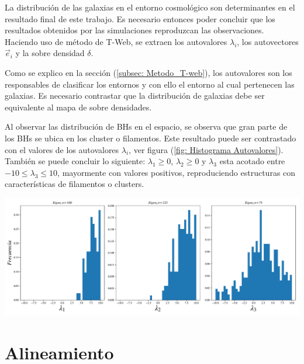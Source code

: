 La distribución de las galaxias en el entorno cosmológico son determinantes en el resultado final de este trabajo. Es necesario entonces poder concluir que los resultados obtenidos por las simulaciones reproduzcan las observaciones. Haciendo uso de método de T-Web, se extraen los autovalores $\lambda_{i}$, los autovectores $\vec{e}_{i}$ y la sobre densidad $\delta$. 

Como se explico en la sección (\ref{subsec: Metodo_T-web}),  los autovalores son los responsables de clasificar los entornos y con ello el entorno al cual pertenecen las galaxias. Es necesario contrastar que la distribución de galaxias debe ser equivalente al mapa de sobre densidades. 


Al observar las distribución de BHs en el espacio, se observa que gran parte de los BHs se ubica en los cluster o filamentos. Este resultado puede ser contrastado con el valores de los autovalores $\lambda_{i}$, ver figura (\ref{fig: Histograma Autovalores}). También se puede concluir lo siguiente:  $\lambda_{1}\geq 0$,  $\lambda_{2}\geq 0$ y $\lambda_{3}$ esta acotado entre $-10 \leq \lambda_{3}\leq 10$, mayormente con valores positivos, reproduciendo estructuras con características de filamentos o clusters. 
%
\begin{center}
\includegraphics[scale=.4]{./figures/6_Resultados/cosmo01/histograma_autovalores.pdf}
\label{fig: Histograma Autovalores}
\end{center}
%




\section{ Alineamiento}
\label{sec: Alineamiento}


